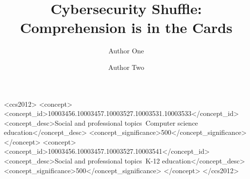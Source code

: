 \documentclass[sigconf]{acmart}
\begin{document}
\title{Cybersecurity Shuffle: Comprehension is in the Cards}


\author{
  Author One
}

\author{
  Author Two
}




\begin{CCSXML}
<ccs2012>
<concept>
<concept_id>10003456.10003457.10003527.10003531.10003533</concept_id>
<concept_desc>Social and professional topics~Computer science education</concept_desc>
<concept_significance>500</concept_significance>
</concept>
<concept>
<concept_id>10003456.10003457.10003527.10003541</concept_id>
<concept_desc>Social and professional topics~K-12 education</concept_desc>
<concept_significance>500</concept_significance>
</concept>
</ccs2012>
\end{CCSXML}



\maketitle




%

%
%







\end{document}
